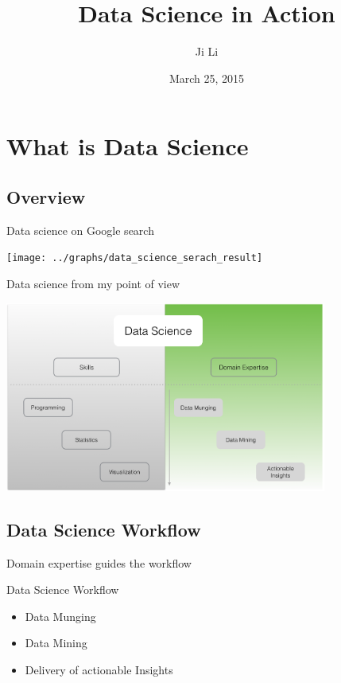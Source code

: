 \documentclass[10pt]{beamer}
\title[Data Science In Action]{Data Science in Action}
\author[JL]{Ji Li}
\institute[Ji Li]{Data Scientist}
\date{March 25, 2015}
\begin{document}
\frame{\titlepage}


\section{What is Data Science}

  \subsection{Overview}

    \begin{frame}{Data science on Google search}
      \begin{center}
        \texttt{[image: ../graphs/data\_science\_serach\_result]}
      \end{center}
    \end{frame}

    \begin{frame}{Data science from my point of view}
      \begin{center}
        \includegraphics[width=300pt]{../graphs/data_science_structure}
      \end{center}
    \end{frame}

  \subsection{Data Science Workflow}

    \begin{frame}{Domain expertise guides the workflow}
         \begin{block}{Data Science Workflow}
          \smallskip
           \begin{itemize}
             \item Data Munging
             \smallskip
             \item Data Mining
             \smallskip
             \item Delivery of actionable Insights
           \end{itemize}
         \end{block}
    \end{frame}
  
\end{document}
